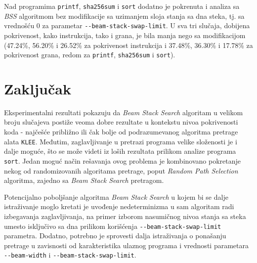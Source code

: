 \documentclass[a4paper]{article}
\begin{document}
Nad programima \verb|printf|, \verb|sha256sum| i \verb|sort| dodatno je pokrenuta i analiza sa \textit{BSS} algoritmom bez modifikacije sa uzimanjem sloja stanja sa dna steka, tj. sa vrednošću 0 za parametar \verb|--beam-stack-swap-limit|. U sva tri slučaja, dobijena pokrivenost, kako instrukcija, tako i grana, je bila manja nego sa modifikacijom (47.24\%, 56.20\% i 26.52\% za pokrivenost instrukcija i 37.48\%, 36.30\% i 17.78\% za pokrivenost grana, redom za \verb|printf|, \verb|sha256sum| i \verb|sort|).

\section{Zaključak}

Eksperimentalni rezultati pokazuju da \textit{Beam Stack Search} algoritam u velikom broju slučajeva postiže veoma dobre rezultate u kontekstu nivoa pokrivenosti koda - najčešće približno ili čak bolje od podrazumevanog algoritma pretrage alata \verb|KLEE|. Međutim, zaglavljivanje u pretrazi programa velike složenosti je i dalje moguće, što se može videti iz loših rezultata prilikom analize programa \verb|sort|. Jedan moguć način rešavanja ovog problema je kombinovano pokretanje nekog od randomizovanih algoritama pretrage, poput \textit{Random Path Selection} algoritma, zajedno sa \textit{Beam Stack Search} pretragom.

Potencijalno poboljšanje algoritma \textit{Beam Stack Search} u kojem bi se dalje istraživanje moglo kretati je uvođenje nedeterminizma u sam algoritam radi izbegavanja zaglavljivanja, na primer izborom nasumičnog nivoa stanja sa steka umesto isključivo sa dna prilikom korišćenja \verb|--beam-stack-swap-limit| parametra. Dodatno, potrebno je sprovesti dalja istraživanja o ponašanju pretrage u zavisnosti od karakteristika ulaznog programa i vrednosti parametara \verb|--beam-width| i \verb|--beam-stack-swap-limit|.

\appendix


\end{document}

